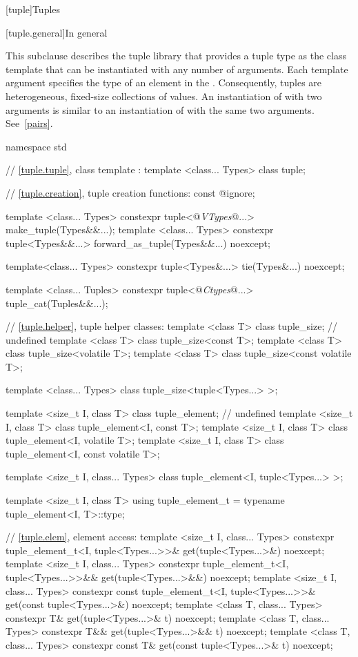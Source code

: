 [tuple]{Tuples}

[tuple.general]{In general}

\pnum
{}%
This subclause describes the tuple library that provides a tuple type as
the class template  that can be instantiated with any number
of arguments. Each template argument specifies
the type of an element in the .  Consequently, tuples are
heterogeneous, fixed-size collections of values. An instantiation of  with
two arguments is similar to an instantiation of  with the same two arguments.
See~\ref{pairs}.

\pnum
{}

%
\begin{codeblock}
namespace std {
  // \ref{tuple.tuple}, class template :
  template <class... Types> class tuple;

  // \ref{tuple.creation}, tuple creation functions:
  const @\unspec@ ignore;

  template <class... Types>
    constexpr tuple<@\textit{VTypes}@...> make_tuple(Types&&...);
  template <class... Types>
    constexpr tuple<Types&&...> forward_as_tuple(Types&&...) noexcept;

  template<class... Types>
    constexpr tuple<Types&...> tie(Types&...) noexcept;

  template <class... Tuples>
    constexpr tuple<@\textit{Ctypes}@...> tuple_cat(Tuples&&...);

  // \ref{tuple.helper}, tuple helper classes:
  template <class T> class tuple_size;  // undefined
  template <class T> class tuple_size<const T>;
  template <class T> class tuple_size<volatile T>;
  template <class T> class tuple_size<const volatile T>;

  template <class... Types> class tuple_size<tuple<Types...> >;

  template <size_t I, class T> class tuple_element;    // undefined
  template <size_t I, class T> class tuple_element<I, const T>;
  template <size_t I, class T> class tuple_element<I, volatile T>;
  template <size_t I, class T> class tuple_element<I, const volatile T>;

  template <size_t I, class... Types> class tuple_element<I, tuple<Types...> >;

  template <size_t I, class T>
    using tuple_element_t = typename tuple_element<I, T>::type;

  // \ref{tuple.elem}, element access:
  template <size_t I, class... Types>
    constexpr tuple_element_t<I, tuple<Types...>>&
      get(tuple<Types...>&) noexcept;
  template <size_t I, class... Types>
    constexpr tuple_element_t<I, tuple<Types...>>&&
      get(tuple<Types...>&&) noexcept;
  template <size_t I, class... Types>
    constexpr const tuple_element_t<I, tuple<Types...>>&
      get(const tuple<Types...>&) noexcept;
  template <class T, class... Types>
    constexpr T& get(tuple<Types...>& t) noexcept;
  template <class T, class... Types>
    constexpr T&& get(tuple<Types...>&& t) noexcept;
  template <class T, class... Types>
    constexpr const T& get(const tuple<Types...>& t) noexcept;

}
\end{codeblock}
